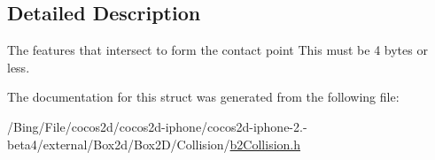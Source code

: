 \subsection{Detailed Description}
The features that intersect to form the contact point This must be 4 bytes or less. 

The documentation for this struct was generated from the following file\-:\begin{DoxyCompactItemize}
\item 
/\-Bing/\-File/cocos2d/cocos2d-\/iphone/cocos2d-\/iphone-\/2.-\/beta4/external/\-Box2d/\-Box2\-D/\-Collision/\hyperlink{b2_collision_8h}{b2\-Collision.\-h}\end{DoxyCompactItemize}
